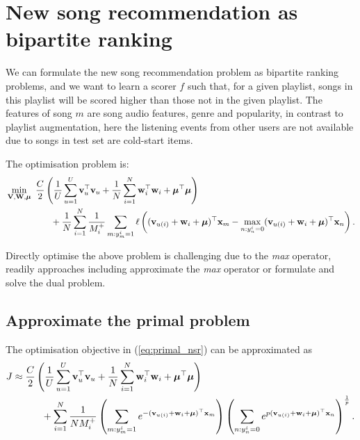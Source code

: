 \section{New song recommendation as bipartite ranking}

We can formulate the new song recommendation problem as bipartite ranking problems, 
and we want to learn a scorer $f$ such that, for a given playlist, 
songs in this playlist will be scored higher than those not in the given playlist.
The features of song $m$ are song audio features, genre and popularity, in contrast to playlist augmentation,
here the listening events from other users are not available due to songs in test set are cold-start items.

The optimisation problem is:
\begin{equation}
\label{eq:primal_nsr}
\begin{aligned}
&\min_{\mathbf{V}, \mathbf{W}, \bm{\mu}} \ \frac{C}{2} \left( \frac{1}{U} \sum_{u=1}^U \mathbf{v}_u^\top \mathbf{v}_u 
     + \frac{1}{N} \sum_{i=1}^N \mathbf{w}_i^\top \mathbf{w}_i + \bm{\mu}^\top \bm{\mu} \right) \\
& \hspace{5em}
     + \frac{1}{N} \sum_{i=1}^N \frac{1}{M_i^+} \sum_{m: y_m^i = 1} \ell \left( (\mathbf{v}_{u(i)} + \mathbf{w}_i + \bm{\mu})^\top \mathbf{x}_m 
     - \max_{n: y_n^i = 0} (\mathbf{v}_{u(i)} + \mathbf{w}_i + \bm{\mu})^\top \mathbf{x}_n \right).
\end{aligned}
\end{equation}

Directly optimise the above problem is challenging due to the \emph{max} operator,
readily approaches including approximate the \emph{max} operator or formulate and solve the dual problem.


\subsection{Approximate the primal problem}
The optimisation objective in (\ref{eq:primal_nsr}) can be approximated as
\begin{equation*}
\begin{aligned}
J 
&\approx \frac{C}{2} \left( \frac{1}{U} \sum_{u=1}^U \mathbf{v}_u^\top \mathbf{v}_u + \frac{1}{N} \sum_{i=1}^N \mathbf{w}_i^\top \mathbf{w}_i + \bm{\mu}^\top \bm{\mu} \right) \\
& \hspace{3em}
  + \sum_{i=1}^N \frac{1}{N M_i^+} 
    \left( \sum_{m: y_m^i = 1} e^{-(\mathbf{v}_{u(i)} + \mathbf{w}_i + \bm{\mu})^\top \mathbf{x}_m} \right)
    \left( \sum_{n: y_n^i = 0} e^{p (\mathbf{v}_{u(i)} + \mathbf{w}_i + \bm{\mu})^\top \mathbf{x}_n} \right)^\frac{1}{p}.
\end{aligned}
\end{equation*}


